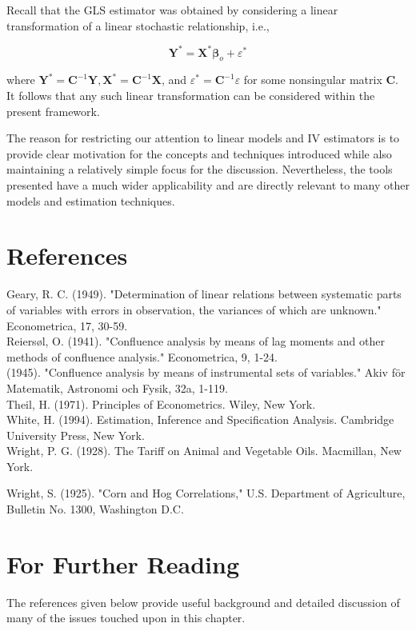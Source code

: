 \documentclass[10pt]{article}
\begin{document}
Recall that the GLS estimator was obtained by considering a linear transformation of a linear stochastic relationship, i.e.,

$$
\mathbf{Y}^{*}=\mathbf{X}^{*} \boldsymbol{\beta}_{o}+\varepsilon^{*}
$$

where $\mathbf{Y}^{*}=\mathbf{C}^{-1} \mathbf{Y}, \mathbf{X}^{*}=\mathbf{C}^{-1} \mathbf{X}$, and $\varepsilon^{*}=\mathbf{C}^{-1} \varepsilon$ for some nonsingular matrix $\mathbf{C}$. It follows that any such linear transformation can be considered within the present framework.

The reason for restricting our attention to linear models and IV estimators is to provide clear motivation for the concepts and techniques introduced while also maintaining a relatively simple focus for the discussion. Nevertheless, the tools presented have a much wider applicability and are directly relevant to many other models and estimation techniques.

\section*{References}
Geary, R. C. (1949). "Determination of linear relations between systematic parts of variables with errors in observation, the variances of which are unknown." Econometrica, 17, 30-59.\\
Reiersøl, O. (1941). "Confluence analysis by means of lag moments and other methods of confluence analysis." Econometrica, 9, 1-24.\\
(1945). "Confluence analysis by means of instrumental sets of variables." Akiv för Matematik, Astronomi och Fysik, 32a, 1-119.\\
Theil, H. (1971). Principles of Econometrics. Wiley, New York.\\
White, H. (1994). Estimation, Inference and Specification Analysis. Cambridge University Press, New York.\\
Wright, P. G. (1928). The Tariff on Animal and Vegetable Oils. Macmillan, New York.

Wright, S. (1925). "Corn and Hog Correlations," U.S. Department of Agriculture, Bulletin No. 1300, Washington D.C.

\section*{For Further Reading}
The references given below provide useful background and detailed discussion of many of the issues touched upon in this chapter.
\end{document}
